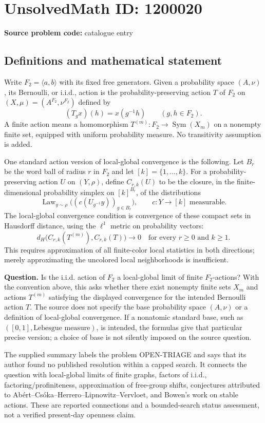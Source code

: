 \documentclass[11pt]{article}
\begin{document}
\section*{UnsolvedMath ID: 1200020}
\textbf{Source problem code:} catalogue entry
\subsection{Definitions and mathematical statement}
Write $F_2=\langle a,b\rangle$ with its fixed free generators. Given a probability space $(A,\nu)$, its Bernoulli, or i.i.d., action is the probability-preserving action $T$ of $F_2$ on $(X,\mu)=(A^{F_2},\nu^{F_2})$ defined by
\[
 (T_gx)(h)=x(g^{-1}h)\qquad(g,h\in F_2).
\]
A finite action means a homomorphism $T^{(m)}:F_2\to\operatorname{Sym}(X_m)$ on a nonempty finite set, equipped with uniform probability measure. No transitivity assumption is added.

One standard action version of local-global convergence is the following. Let $B_r$ be the word ball of radius $r$ in $F_2$ and let $[k]=\{1,\ldots,k\}$. For a probability-preserving action $U$ on $(Y,\rho)$, define $C_{r,k}(U)$ to be the closure, in the finite-dimensional probability simplex on $[k]^{B_r}$, of the distributions
\[
 \operatorname{Law}_{y\sim\rho}\bigl((c(U_{g^{-1}}y))_{g\in B_r}\bigr),
 \qquad c:Y\to[k]\text{ measurable}.
\]
The local-global convergence condition is convergence of these compact sets in Hausdorff distance, using the $\ell^1$ metric on probability vectors:
\[
 d_H\bigl(C_{r,k}(T^{(m)}),C_{r,k}(T)\bigr)\longrightarrow0
 \quad\text{for every }r\geq0\text{ and }k\geq1.
\]
This requires approximation of all finite-color local statistics in both directions; merely approximating the uncolored local neighborhoods is insufficient.

\textbf{Question.} Is the i.i.d. action of $F_2$ a local-global limit of finite $F_2$-actions? With the convention above, this asks whether there exist nonempty finite sets $X_m$ and actions $T^{(m)}$ satisfying the displayed convergence for the intended Bernoulli action $T$. The source does not specify the base probability space $(A,\nu)$ or a definition of local-global convergence. If a nonatomic standard base, such as $([0,1],\text{Lebesgue measure})$, is intended, the formulas give that particular precise version; a choice of base is not silently imposed on the source question.

The supplied summary labels the problem OPEN-TRIAGE and says that its author found no published resolution within a capped search. It connects the question with local-global limits of finite graphs, factors of i.i.d., factoring/profiniteness, approximation of free-group shifts, conjectures attributed to Ab\'ert--Cs\'oka--Herrero--Lipnowitz--Vervloet, and Bowen's work on stable actions. These are reported connections and a bounded-search status assessment, not a verified present-day openness claim.
\end{document}
